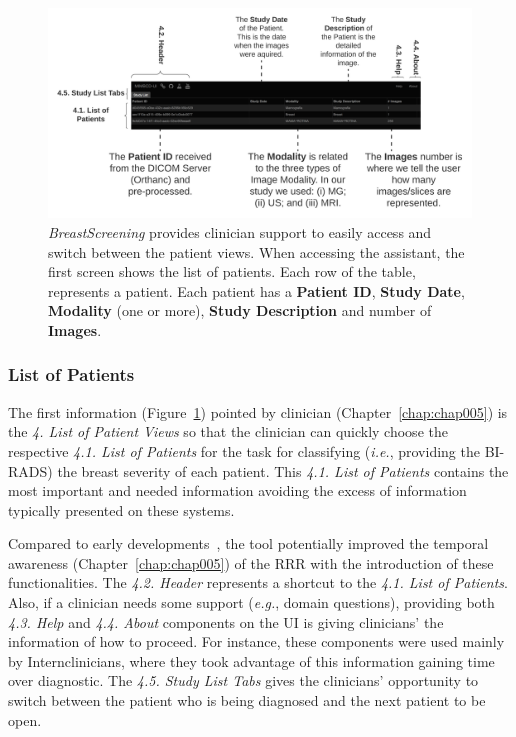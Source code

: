 \begin{figure}[ht]
\centering
\includegraphics[width=\textwidth]{images/fig003}
\caption{{\it BreastScreening} provides clinician support to easily access and switch between the patient views. When accessing the assistant, the first screen shows the list of patients. Each row of the table, represents a patient. Each patient has a {\bf Patient ID}, {\bf Study Date}, {\bf Modality} (one or more), {\bf Study Description} and number of {\bf Images}.}
\label{fig:fig003}
\end{figure}

\subsubsection{List of Patients}
\label{sec:sec004003001001}

The first information (Figure~\ref{fig:fig003}) pointed by clinician (Chapter~\ref{chap:chap005}) is the {\it 4. List of Patient Views} so that the clinician can quickly choose the respective {\it 4.1. List of Patients} for the task for classifying ({\it i.e.}, providing the \ac{BI-RADS}) the breast severity of each patient.
This {\it 4.1. List of Patients} contains the most important and needed information avoiding the excess of information typically presented on these systems.

Compared to early developments~\cite{10.1145/3132272.3134111, calisto2017mimbcdui}, the tool potentially improved the temporal awareness (Chapter~\ref{chap:chap005}) of the \ac{RRR} with the introduction of these functionalities.
The {\it 4.2. Header} represents a shortcut to the {\it 4.1. List of Patients}.
Also, if a clinician needs some support ({\it e.g.}, domain questions), providing both {\it 4.3. Help} and {\it 4.4. About} components on the \ac{UI} is giving clinicians' the information of how to proceed.
For instance, these components were used mainly by Intern\footnotemark[12] clinicians, where they took advantage of this information gaining time over diagnostic.
The {\it 4.5. Study List Tabs} gives the clinicians' opportunity to switch between the patient who is being diagnosed and the next patient to be open.

